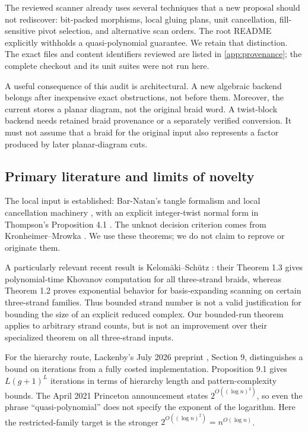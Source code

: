 \documentclass[11pt,letterpaper]{article}
\theoremstyle{definition}
\newcommand{\code}[1]{\texttt{\detokenize{#1}}}
\begin{document}
The reviewed scanner already uses several techniques that a new proposal should not rediscover: bit-packed morphisms, local gluing plans, unit cancellation, fill-sensitive pivot selection, and alternative scan orders. The root README explicitly withholds a quasi-polynomial guarantee. We retain that distinction. The exact files and content identifiers reviewed are listed in \cref{app:provenance}; the complete checkout and its unit suites were not run here.

A useful consequence of this audit is architectural. A new algebraic backend belongs after inexpensive exact obstructions, not before them. Moreover, the current \code{Diagram} stores a planar diagram, not the original braid word. A twist-block backend needs retained braid provenance or a separately verified conversion. It must not assume that a braid for the original input also represents a factor produced by later planar-diagram cuts.

\subsection{Primary literature and limits of novelty}
The local input is established: Bar-Natan's tangle formalism and local cancellation machinery \cite{bn05,bn07}, with an explicit integer-twist normal form in Thompson's Proposition 4.1 \cite{thompson}. The unknot decision criterion comes from Kronheimer--Mrowka \cite{km}. We use these theorems; we do not claim to reprove or originate them.

A particularly relevant recent result is Kelom\"aki--Sch\"utz \cite{ks26}: their Theorem 1.3 gives polynomial-time Khovanov computation for all three-strand braids, whereas Theorem 1.2 proves exponential behavior for basis-expanding scanning on certain three-strand families. Thus bounded strand number is not a valid justification for bounding the size of an explicit reduced complex. Our bounded-run theorem applies to arbitrary strand counts, but is not an improvement over their specialized theorem on all three-strand inputs.

For the hierarchy route, Lackenby's July 2026 preprint \cite{lackenby26}, Section 9, distinguishes a bound on iterations from a fully costed implementation. Proposition 9.1 gives \(L(g+1)^L\) iterations in terms of hierarchy length and pattern-complexity bounds. The April 2021 Princeton announcement \cite{lackenby21} states \(2^{O((\log n)^3)}\), so even the phrase ``quasi-polynomial'' does not specify the exponent of the logarithm. Here the restricted-family target is the stronger \(2^{O((\log n)^2)}=n^{O(\log n)}\).
\end{document}
